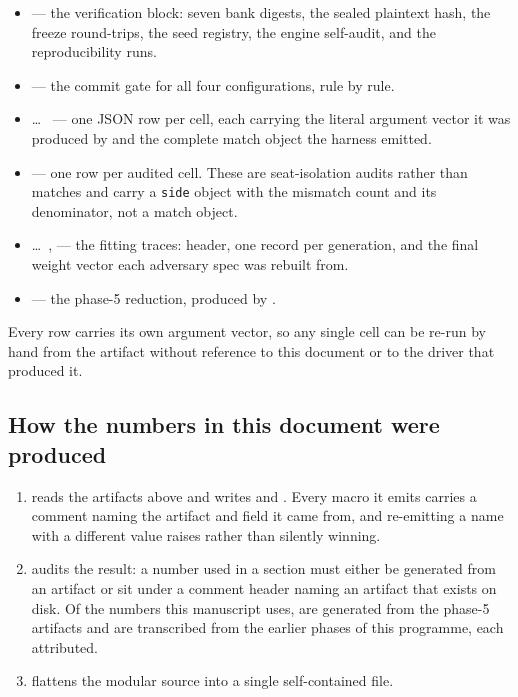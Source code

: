 \begin{itemize}
\item {} --- the verification block: seven bank digests, the sealed plaintext hash,
  the freeze round-trips, the seed registry, the engine self-audit, and the reproducibility runs.
\item {} --- the commit gate for all four configurations, rule by rule.
\item {} \ldots\  --- one JSON row per cell, each carrying
  the literal argument vector it was produced by and the complete match object the harness emitted.
\item {} --- one row per audited cell. These are seat-isolation audits rather
  than matches and carry a \texttt{side} object with the mismatch count and its denominator, not a
  match object.
\item {} \ldots\ ,  --- the
  fitting traces: header, one record per generation, and the final weight vector each adversary spec
  was rebuilt from.
\item {} --- the phase-5 reduction, produced by .
\end{itemize}

Every row carries its own argument vector, so any single cell can be re-run by hand from the artifact
without reference to this document or to the driver that produced it.

\subsection*{How the numbers in this document were produced}

\begin{enumerate}
\item {} reads the artifacts above and writes
   and . Every macro it
  emits carries a comment naming the artifact and field it came from, and re-emitting a name with a
  different value raises rather than silently winning.
\item {} audits the result: a number used in a section
  must either be generated from an artifact or sit under a comment header naming an artifact that
  exists on disk. Of the numbers this manuscript uses, \vsevenProvGenerated{} are generated from the
  phase-5 artifacts and \vsevenProvTranscribed{} are transcribed from the earlier phases of this
  programme, each attributed.
\item {} flattens the modular source into a single self-contained file.
\end{enumerate}

